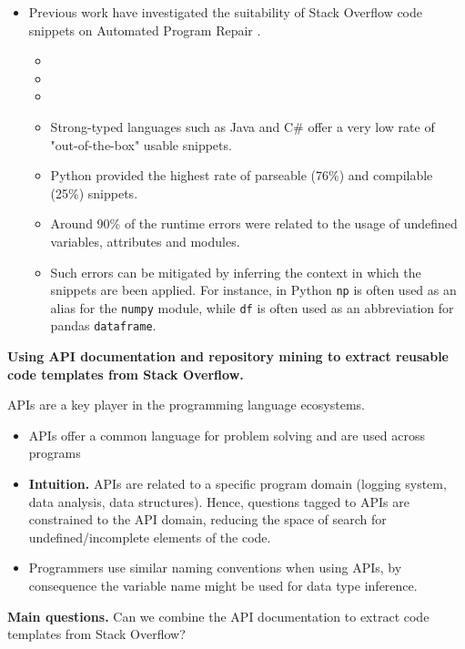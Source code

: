 \begin{itemize}
	\item Previous work have investigated the suitability of Stack Overflow code snippets on Automated Program Repair \cite{Yang:2016_FromQueryToUsableCode} .
	
	\begin{itemize}
	    \item {}
	    \item {}
	    \item {}
		\item Strong-typed languages such as Java and C\# offer a very low rate of "out-of-the-box" usable snippets.
		\item Python provided the highest rate of parseable (76\%) and compilable (25\%) snippets. 
		\item Around 90\% of the runtime errors were related to the usage of undefined variables, attributes and modules.
		\item Such errors can be mitigated by inferring the context in which the snippets are been applied. For instance, in Python \texttt{np} is often used as an alias for the \texttt{numpy} module, while \texttt{df} is often used as an abbreviation for pandas \texttt{dataframe}.
		
	\end{itemize}		
\end{itemize}		

\textbf{Using API documentation and repository mining to extract reusable code templates from Stack Overflow.}

APIs are a key player in the programming language ecosystems. 
\begin{itemize}
	\item APIs offer a common language for problem solving and are used across programs
	\item \textbf{Intuition.} APIs are related to a specific program domain (logging system, data analysis, data structures). Hence, questions tagged to APIs are constrained to the API domain, reducing the space of search for undefined/incomplete elements of the code.  
	\item Programmers use similar naming conventions when using APIs, by consequence the variable name might be used for data type inference.

\end{itemize}
	
\textbf{Main questions.} Can we combine the API documentation to extract code templates from Stack Overflow? 

